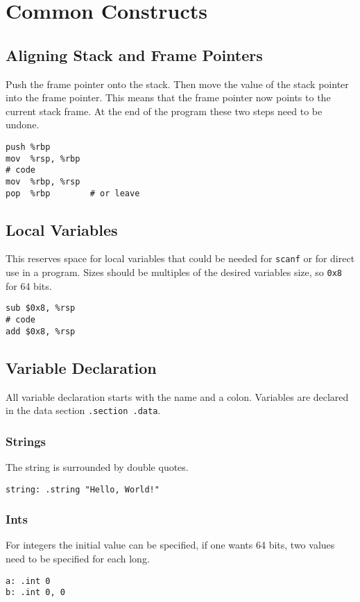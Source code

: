 \documentclass[reqno,a4paper,11pt]{amsart}
\begin{document}
\section{Common Constructs}
\subsection{Aligning Stack and Frame Pointers}
Push the frame pointer onto the stack. Then move the value of the stack pointer
into the frame pointer. This means that the frame pointer now points to the
current stack frame. At the end of the program these two steps need to be
undone.
\begin{lstlisting}
push %rbp
mov  %rsp, %rbp
# code
mov  %rbp, %rsp
pop  %rbp        # or leave
\end{lstlisting}
\subsection{Local Variables}
This reserves space for local variables that could be needed for \texttt{scanf}
or for direct use in a program. Sizes should be multiples of the desired
variables size, so \texttt{0x8} for 64 bits.
\begin{lstlisting}
sub $0x8, %rsp
# code
add $0x8, %rsp
\end{lstlisting}
\subsection{Variable Declaration}
All variable declaration starts with the name and a colon. Variables are
declared in the data section \texttt{.section .data}. 
\subsubsection{Strings}
The string is surrounded by double quotes.
\begin{lstlisting}
string: .string "Hello, World!"
\end{lstlisting}
\subsubsection{Ints}
For integers the initial value can be specified, if one wants 64 bits, two
values need to be specified for each long.
\begin{lstlisting}
a: .int 0
b: .int 0, 0
\end{lstlisting}
\end{document}
